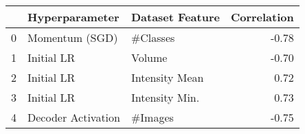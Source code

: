 \begin{tabular}{lllr}
\toprule
 & Hyperparameter & Dataset Feature & Correlation \\
\midrule
0 & Momentum (SGD) & #Classes & -0.78 \\
1 & Initial LR & Volume & -0.70 \\
2 & Initial LR & Intensity Mean & 0.72 \\
3 & Initial LR & Intensity Min. & 0.73 \\
4 & Decoder Activation & #Images & -0.75 \\
\bottomrule
\end{tabular}

